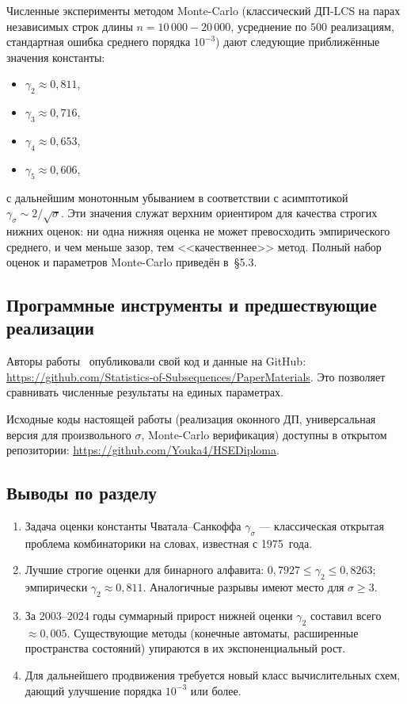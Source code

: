 Численные эксперименты методом Monte-Carlo (классический ДП-LCS на парах независимых строк длины $n = 10\,000{-}20\,000$, усреднение по $500$ реализациям, стандартная ошибка среднего порядка $10^{-3}$) дают следующие приближённые значения константы:
\begin{itemize}
    \item $\gamma_2 \approx 0{,}811$,
    \item $\gamma_3 \approx 0{,}716$,
    \item $\gamma_4 \approx 0{,}653$,
    \item $\gamma_5 \approx 0{,}606$,
\end{itemize}
с дальнейшим монотонным убыванием в соответствии с асимптотикой $\gamma_\sigma \sim 2/\sqrt{\sigma}$. Эти значения служат верхним ориентиром для качества строгих нижних оценок: ни одна нижняя оценка не может превосходить эмпирического среднего, и чем меньше зазор, тем <<качественнее>> метод. Полный набор оценок и параметров Monte-Carlo приведён в~\S5.3.

\subsection{Программные инструменты и предшествующие реализации}

Авторы работы~\cite{heineman2024} опубликовали свой код и данные на GitHub: \url{https://github.com/Statistics-of-Subsequences/PaperMaterials}. Это позволяет сравнивать численные результаты на единых параметрах.

Исходные коды настоящей работы (реализация оконного ДП, универсальная версия для произвольного $\sigma$, Monte-Carlo верификация) доступны в открытом репозитории: \url{https://github.com/Youka4/HSEDiploma}.

\subsection*{Выводы по разделу}

\begin{enumerate}
    \item Задача оценки константы Чватала--Санкоффа $\gamma_\sigma$ --- классическая открытая проблема комбинаторики на словах, известная с 1975~года.
    \item Лучшие строгие оценки для бинарного алфавита: $0{,}7927 \leq \gamma_2 \leq 0{,}8263$; эмпирически $\gamma_2 \approx 0{,}811$. Аналогичные разрывы имеют место для $\sigma \geq 3$.
    \item За 2003--2024 годы суммарный прирост нижней оценки $\gamma_2$ составил всего $\approx 0{,}005$. Существующие методы (конечные автоматы, расширенные пространства состояний) упираются в их экспоненциальный рост.
    \item Для дальнейшего продвижения требуется новый класс вычислительных схем, дающий улучшение порядка $10^{-3}$ или более.
\end{enumerate}
